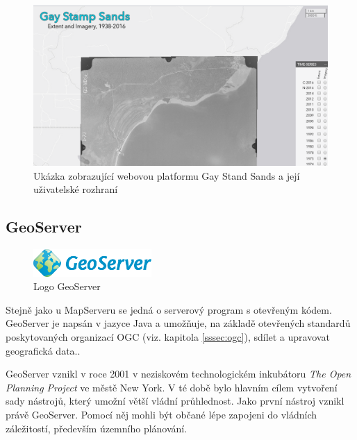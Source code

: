 \begin{figure}[h!]  \centering
\includegraphics[width=1\textwidth]{../img/gay-sands.png}
	\caption{Ukázka zobrazující webovou platformu Gay Stand
Sands a její uživatelské rozhraní}
	\label{fig:gay-sands}
\end{figure}

\newpage
\subsection{GeoServer}
\label{sssec:geoserver}

\begin{figure}[h!]  \centering
\includegraphics[width=0.4\textwidth]{../img/geoserver-logo.png}
	\caption{Logo GeoServer 
	\cite{geoserver-layer-edit}}
	\label{fig:geoserver-logo}
\end{figure} \bigskip

Stejně jako u MapServeru se jedná o serverový program s otevřeným
kódem. GeoServer je napsán v jazyce Java a umožňuje, na základě
otevřených standardů poskytovaných organizací OGC (viz. kapitola \ref{sssec:ogc}), sdílet a upravovat
geografická data..

GeoServer vznikl v roce 2001 v neziskovém technologickém inkubátoru
\textit{The Open Planning Project} ve městě New York. V té době bylo
hlavním cílem vytvoření sady nástrojů, který umožní větší vládní
průhlednost. Jako první nástroj vznikl právě GeoServer. Pomocí něj
mohli být občané lépe zapojeni do vládních záležitostí, především
územního plánování.

